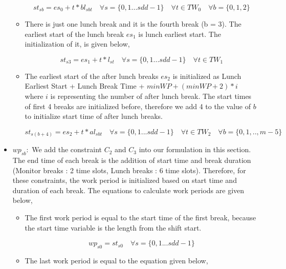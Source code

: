 \begin{itemize}
\begin{itemize}
\begin{equation}
st_{sb} =es_0 + t * bl_{sbt} \quad \forall s = \{0, 1 ...sdd -1\} \quad \forall t \in TW_0 \quad \forall b = \{0, 1, 2\}
\end{equation}

\item There is just one lunch break and it is the fourth break (b = 3). The earliest start of the lunch break $es_1$ is lunch earliest start. The initialization of it, is given below,

\begin{equation}
st_{s3} =  es_1 + t * l_{st} \quad \forall s = \{0, 1 ...sdd -1\} \quad \forall t \in TW_1
\end{equation}

\item The earliest start of the after lunch breaks  $es_2$ is  initialized as Lunch Earliest Start + Lunch Break Time + $minWP + (minWP + 2) * i$ where $i$ is representing the number of after lunch break. The start times of first 4 breaks are initialized before, therefore we add 4 to the value of $b$ to initialize start time of after lunch breaks.

\begin{equation}
st_{s(b+4)} =es_2 + t * al_{sbt}  \quad \forall s = \{0, 1 ...sdd -1\} \quad \forall t \in  TW_2 \quad \forall b = \{0, 1, .., m-5\}
\end{equation}

\end{itemize}


\item $wp_{sb} : $ We add the constraint $C_2$ and $C_3$ into our formulation in this section. The end time of each break is the addition of  start time and break duration (Monitor breaks : 2 time slots, Lunch breaks : 6 time slots). Therefore, for these constraints, the work period is initialized based on start time and duration of each break. The equations to calculate work periods are given below,

\begin{itemize}
\item The first work period is equal to the start time of the first break, because the start time variable is the length from the shift start. 

\begin{equation}
wp_{s0} = st_{s0} \quad \forall s = \{0, 1 ...sdd -1\}
\end{equation}

\item The last work period is equal to the equation given below,


\end{itemize}
\end{itemize}
